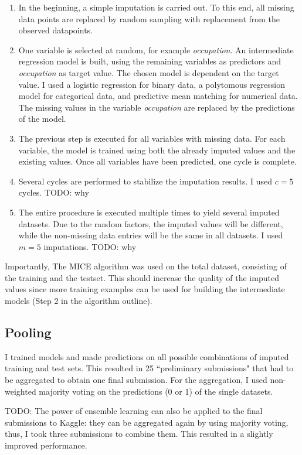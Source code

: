 \documentclass{article}
\begin{document}
\begin{enumerate}
\item In the beginning, a simple imputation is carried out. To
  this end, all missing data points are replaced by random sampling
  with replacement from the observed datapoints.
\item One variable is selected at random, for example
  \emph{occupation}. An intermediate regression model is built, using
  the remaining variables as predictors and \emph{occupation} as target
  value. The chosen model is dependent on the target value. I used a
  logistic regression for binary data, a polytomous regression model
  for categorical data, and predictive mean matching for numerical
  data. The missing values in the variable \emph{occupation} are replaced by the
  predictions of the model.
\item The previous step is executed for all variables with missing
  data. For each variable, the model is trained using both the already imputed values and the existing values. Once all variables have been predicted, one cycle is complete.
\item Several cycles are performed to stabilize the imputation
  results. I used $c = 5$ cycles. TODO: why
\item The entire procedure is executed multiple times to yield
  several imputed datasets. Due to the random factors, the imputed
  values will be different, while the non-missing data entries will be
  the same in all datasets. I used $m = 5$ imputations. TODO: why
\end{enumerate}

Importantly, The MICE algorithm was used on the total dataset, consisting of the
training and the testset. This should increase
the quality of the imputed values since more training examples can be
used for building the intermediate models (Step 2 in the algorithm
outline).

\subsection{Pooling}

I trained models and made predictions on all possible combinations of imputed training and test sets. This resulted in 25 ``preliminary submissions" that had to be aggregated to obtain one final submission. For the aggregation, I used non-weighted majority voting on the predictions (0 or 1) of the single datasets.

TODO:
The power of ensemble learning can also be applied to the final submissions to Kaggle: they can be aggregated again by using majority voting, thus, I took three submissions to combine them. This resulted in a slightly improved performance.
\end{document}
